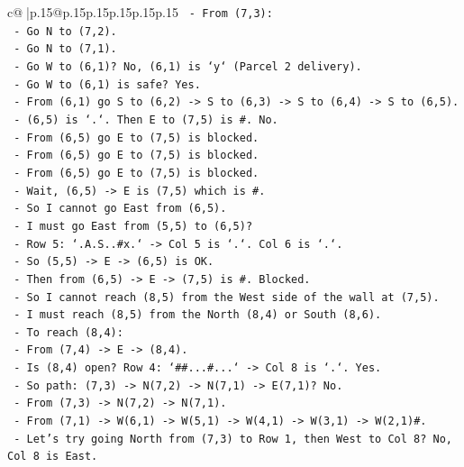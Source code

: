 \documentclass{article}
\begin{document}
{\begin{supertabular}{c@{$\;$}|p{.15\linewidth}@{}p{.15\linewidth}p{.15\linewidth}p{.15\linewidth}p{.15\linewidth}p{.15\linewidth}}
{{{\texttt{      {-} From (7,3):} \\
\texttt{        {-} Go N to (7,2).} \\
\texttt{        {-} Go N to (7,1).} \\
\texttt{        {-} Go W to (6,1)? No, (6,1) is `y` (Parcel 2 delivery).} \\
\texttt{        {-} Go W to (6,1) is safe? Yes.} \\
\texttt{        {-} From (6,1) go S to (6,2) {-}> S to (6,3) {-}> S to (6,4) {-}> S to (6,5).} \\
\texttt{        {-} (6,5) is `.`. Then E to (7,5) is \#. No.} \\
\texttt{        {-} From (6,5) go E to (7,5) is blocked.} \\
\texttt{        {-} From (6,5) go E to (7,5) is blocked.} \\
\texttt{        {-} From (6,5) go E to (7,5) is blocked.} \\
\texttt{        {-} Wait, (6,5) {-}> E is (7,5) which is \#.} \\
\texttt{        {-} So I cannot go East from (6,5).} \\
\texttt{        {-} I must go East from (5,5) to (6,5)?} \\
\texttt{        {-} Row 5: `.A.S..\#x.` {-}> Col 5 is `.`. Col 6 is `.`.} \\
\texttt{        {-} So (5,5) {-}> E {-}> (6,5) is OK.} \\
\texttt{        {-} Then from (6,5) {-}> E {-}> (7,5) is \#. Blocked.} \\
\texttt{        {-} So I cannot reach (8,5) from the West side of the wall at (7,5).} \\
\texttt{        {-} I must reach (8,5) from the North (8,4) or South (8,6).} \\
\texttt{        {-} To reach (8,4):} \\
\texttt{          {-} From (7,4) {-}> E {-}> (8,4).} \\
\texttt{          {-} Is (8,4) open? Row 4: `\#\#...\#...` {-}> Col 8 is `.`. Yes.} \\
\texttt{          {-} So path: (7,3) {-}> N(7,2) {-}> N(7,1) {-}> E(7,1)? No.} \\
\texttt{          {-} From (7,3) {-}> N(7,2) {-}> N(7,1).} \\
\texttt{          {-} From (7,1) {-}> W(6,1) {-}> W(5,1) {-}> W(4,1) {-}> W(3,1) {-}> W(2,1)\#.} \\
\texttt{          {-} Let's try going North from (7,3) to Row 1, then West to Col 8? No, Col 8 is East.} \\
}}}
\end{supertabular}}
\end{document}
